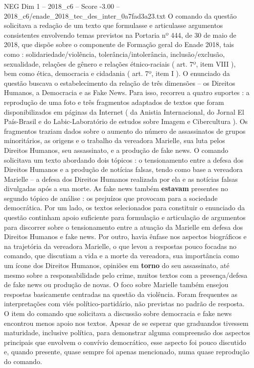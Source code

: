 \begin{textsample}{NEG Dim 1 – 2018\_c6 – Score -3.00 – 2018\_c6/enade\_2018\_tec\_des\_inter\_0a7fad3a23.txt}
O comando da questão solicitava a redação de um texto que formulasse e articulasse argumentos consistentes envolvendo temas previstos na Portaria nº 444, de 30 de maio de 2018, que dispõe sobre o componente de Formação geral do Enade 2018, tais como : solidariedade/violência, tolerância/intolerância, inclusão/exclusão, sexualidade, relações de gênero e relações étnico-raciais ( art. 7º, item VIII ), bem como ética, democracia e cidadania ( art. 7º, item I ).
O enunciado da questão buscava o estabelecimento da relação de três dimensões – os Direitos Humanos, a Democracia e as Fake News.
Para isso, recorreu a quatro suportes : a reprodução de uma foto e três fragmentos adaptados de textos que foram disponibilizados em páginas da Internet ( da Anistia Internacional, do Jornal El País-Brasil e do Labic-Laboratório de estudos sobre Imagem e Cibercultura ).
Os fragmentos traziam dados sobre o aumento do número de assassinatos de grupos minoritários, as origens e o trabalho da vereadora Marielle, sua luta pelos Direitos Humanos, seu assassinato, e a produção de fake news.
O comando solicitava um texto abordando dois tópicos : o tensionamento entre a defesa dos Direitos Humanos e a produção de notícias falsas, tendo como base a vereadora Marielle – a defesa dos Direitos Humanos realizada por ela e as notícias falsas divulgadas após a sua morte.
As fake news também \textbf{estavam} presentes no segundo tópico de análise : os prejuízos que provocam para a sociedade democrática.
Por um lado, os textos selecionados para constituir o enunciado da questão continham apoio suficiente para formulação e articulação de argumentos para discorrer sobre o tensionamento entre a atuação da Marielle em defesa dos Direitos Humanos e fake news.
Por outro, havia ênfase nos aspectos biográficos e na trajetória da vereadora Marielle, o que levou a respostas pouco focadas no comando, que discutiam a vida e a morte da vereadora, sua importância como um ícone dos Direitos Humanos, opiniões em \textbf{torno} do seu assassinato, até mesmo sobre a responsabilidade pelo crime, muitos textos com a presença/defesa de fake news ou produção de novas.
O foco sobre Marielle também ensejou respostas basicamente centradas na questão da violência.
Foram frequentes as interpretações com viés político-partidário, não previstas no padrão de resposta.
O item do comando que solicitava a discussão sobre democracia e fake news encontrou menos apoio nos textos.
Apesar de se esperar que graduandos tivessem maturidade, inclusive política, para demonstrar alguma compreensão dos aspectos principais que envolvem o convívio democrático, esse aspecto foi pouco discutido e, quando presente, quase sempre foi apenas mencionado, numa quase reprodução do comando.

\end{textsample}
